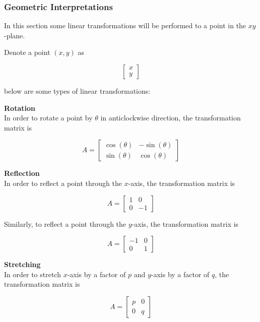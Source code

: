 \documentclass[a4paper,12pt]{article}
\begin{document}
\subsubsection{Geometric Interpretations}
In this section some linear transformations will be performed to a point in the $xy$-plane.\n

\begin{exm}
  Denote a point $(x,y)$ as

  $$\begin{bmatrix}
    x\\
    y
  \end{bmatrix}$$\s

  below are some types of linear transformations:

  \begin{alist}
    \item \textbf{Rotation}\\
    In order to rotate a point by $\theta$ in anticlockwise direction, the transformation matrix is

    $$A=\begin{bmatrix}
      \cos(\theta) & -\sin(\theta)\\
      \sin(\theta) & \cos(\theta)
    \end{bmatrix}$$

    \item \textbf{Reflection}\\
    In order to reflect a point through the $x$-axis, the transformation matrix is

    $$A=\begin{bmatrix}
      1 & 0\\
      0 & -1
    \end{bmatrix}$$\s

    Similarly, to reflect a point through the $y$-axis, the transformation matrix is

    $$A=\begin{bmatrix}
      -1 & 0\\
      0 & 1
    \end{bmatrix}$$

    \item \textbf{Stretching}\\
    In order to stretch $x$-axis by a factor of $p$ and $y$-axis by a factor of $q$, the transformation matrix is

    $$A=\begin{bmatrix}
      p & 0\\
      0 & q
    \end{bmatrix}$$
  \end{alist}
\end{exm}
\end{document}
